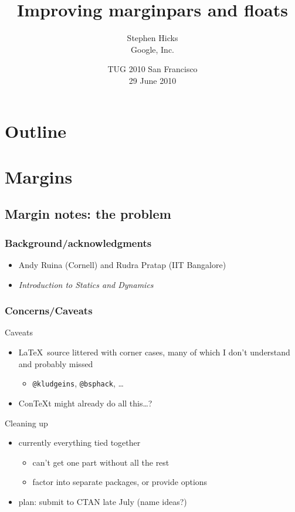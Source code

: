 \documentclass{beamer}
\title{Improving marginpars and floats}
\author{Stephen Hicks\\Google, Inc.}
\date{TUG 2010 San Francisco\\29 June 2010}
\def\cs#1{\texttt{\expandafter\string\csname#1\endcsname}}
\begin{document}

\begin{frame}
  \titlepage
\end{frame}

\section*{Outline}
\begin{frame}
  \tableofcontents
\end{frame}

\section{Margins}
\subsection{Margin notes: the problem}
\begin{frame}
  \frametitle{Background/acknowledgments}
  \begin{itemize}
    \item Andy Ruina (Cornell) and Rudra Pratap (IIT Bangalore)
    \item \emph{Introduction to Statics and Dynamics}
  \end{itemize}
\end{frame}

\begin{frame}
  \frametitle{Concerns/Caveats}
  \begin{block}{Caveats}
    \begin{itemize}
    \item \LaTeX\ source littered with corner cases, many of which
      I don't understand and probably missed 
      \begin{itemize}
      \item \cs{@kludgeins}, \cs{@bsphack}, \ldots
      \end{itemize}
    \item Con\TeX{}t might already do all this\ldots?
    \end{itemize}
  \end{block}
  \begin{block}{Cleaning up}
    \begin{itemize}
    \item currently everything tied together
      \begin{itemize}
      \item can't get one part without all the rest
      \item factor into separate packages, or provide options
      \end{itemize}
    \item plan: submit to CTAN late July (name ideas?)
    \end{itemize}
  \end{block}
\end{frame}
\end{document}
